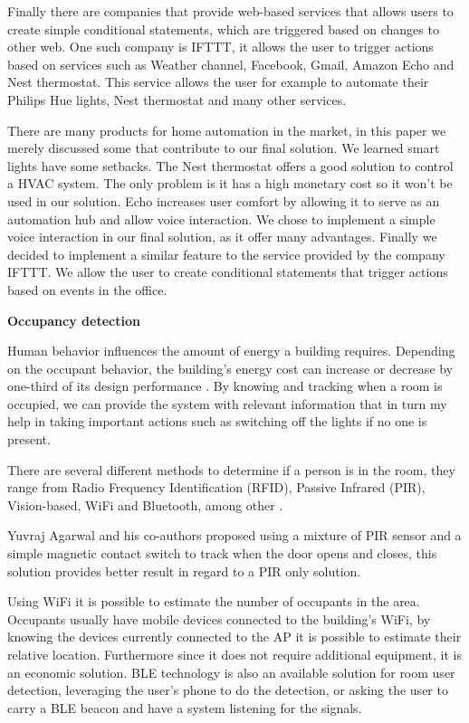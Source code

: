\documentclass[conference]{IEEEtran}
\begin{document}
Finally there are companies that provide web-based services that allows users to create simple conditional statements, which are triggered based on changes to other web. One such company is IFTTT, it allows the user to trigger actions based on services such as Weather channel, Facebook, Gmail, Amazon Echo and Nest thermostat. This service allows the user for example to automate their Philips Hue lights, Nest thermostat and many other services. 


There are many products for home automation in the market, in this paper we merely discussed some that contribute to our final solution. We learned smart lights have some setbacks. The Nest thermostat offers a good solution to control a \ac{HVAC} system. The only problem is it has a high monetary cost so it won't be used in our solution. Echo increases user comfort by allowing it to serve as an automation hub and allow voice interaction. We chose to implement a simple voice interaction in our final solution, as it offer many advantages. Finally we decided to implement a similar feature to the service provided by the company IFTTT. We allow the user to create conditional statements that trigger actions based on events in the office.


\textbf{Occupancy detection}


Human behavior influences the amount of energy a building requires. Depending on the occupant behavior, the building's energy cost can increase or decrease by one-third of its design performance \cite{ocupancy2}. 
By knowing and tracking when a room is occupied, we can provide the system with relevant information that in turn my help in taking important actions such as switching off the lights if no one is present. 

There are several different methods to determine if a person is in the room, they range from Radio Frequency Identification (RFID), Passive Infrared (PIR), Vision-based, \ac{WiFi} and Bluetooth, among other \cite{ocupancy3}.

Yuvraj Agarwal and his co-authors proposed using a mixture of PIR sensor and a simple magnetic contact switch to track when the door opens and closes, this solution provides better result in regard to a PIR only solution\cite{ocupancy1}.

Using \ac{WiFi} it is possible to estimate the number of occupants in the area. Occupants usually have mobile devices connected to the building's \ac{WiFi}, by knowing the devices currently connected to the AP it is possible to estimate their relative location. Furthermore since it does not require additional equipment, it is an economic solution.
\ac{BLE} technology is also an available solution for room user detection, leveraging the user's phone to do the detection, or asking the user to carry a \ac{BLE} beacon and have a system listening for the signals.  
\end{document}
